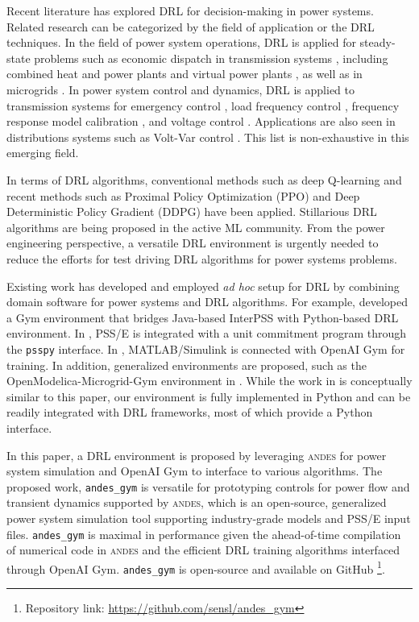 \documentclass[conference]{IEEEtran}
\newcommand{\andesgym}{\texttt{andes\_gym}\xspace}
\newcommand{\andes}{\textsc{andes}\xspace}
\begin{document}
Recent literature has explored DRL for decision-making in power systems.
Related research can be categorized by the field of application or the DRL techniques.
In the field of power system operations, DRL is applied for steady-state problems such as economic dispatch in transmission systems \cite{duan_deep_2019}, including combined heat and power plants\cite{ZHOU2020106016} and virtual power plants \cite{lin_deep_2020}, as well as in microgrids \cite{masburah_adaptive_2021}.
In power system control and dynamics, DRL is applied to transmission systems for emergency control \cite{huang_adaptive_2019}, load frequency control \cite{yan_multi-agent_2020}, frequency response model calibration \cite{li_drl-based_2021}, and voltage control \cite{thayer_deep_2020}. 
Applications are also seen in distributions systems such as Volt-Var control \cite{sun_two-stage_2021}.
This list is non-exhaustive in this emerging field.

In terms of DRL algorithms, conventional methods such as deep Q-learning \cite{yin_design_2018} and recent methods such as Proximal Policy Optimization (PPO) \cite{zhou_deriving_2020} and Deep Deterministic Policy Gradient (DDPG) \cite{zhang_economical_2020} have been applied.
Stillarious DRL algorithms are being proposed in the active ML community.
From the power engineering perspective, a versatile DRL environment is urgently needed to reduce the efforts for test driving DRL algorithms for power systems problems.

Existing work has developed and employed \textit{ad hoc} setup for DRL by combining domain software for power systems and DRL algorithms. For example, \cite{huang_adaptive_2019} developed a Gym environment that bridges Java-based InterPSS with Python-based DRL environment.
In \cite{zhang_hybrid_2021}, PSS/E is integrated with a unit commitment program through the \texttt{psspy} interface. In \cite{beyer_adaptive_2021}, MATLAB/Simulink is connected with OpenAI Gym for training.
In addition, generalized environments are proposed, such as the OpenModelica-Microgrid-Gym environment in \cite{heid_omg_2020}.
While the work in \cite{heid_omg_2020} is conceptually similar to this paper, our environment is fully implemented in Python and can be readily integrated with DRL frameworks, most of which provide a Python interface.

In this paper, a DRL environment is proposed by leveraging \andes \cite{cui_hybrid_2021} for power system simulation and OpenAI Gym \cite{brockman_openai_2016} to interface to various algorithms.
The proposed work, \andesgym is versatile for prototyping controls for power flow and transient dynamics supported by \andes, which is an open-source, generalized power system simulation tool supporting industry-grade models and PSS/E input files. \andesgym is maximal in performance given the ahead-of-time compilation of numerical code in \andes and the efficient DRL training algorithms interfaced through OpenAI Gym.
\andesgym is open-source and available on GitHub 
\footnote{Repository link: \href{https://github.com/sensl/andes\_gym}{https://github.com/sensl/andes\_gym}}.
\end{document}
